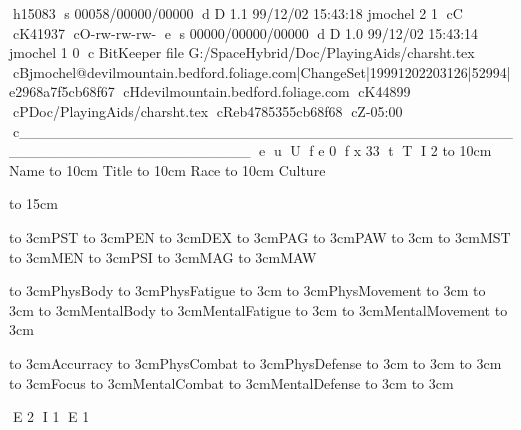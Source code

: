 h15083
s 00058/00000/00000
d D 1.1 99/12/02 15:43:18 jmochel 2 1
cC
cK41937
cO-rw-rw-rw-
e
s 00000/00000/00000
d D 1.0 99/12/02 15:43:14 jmochel 1 0
c BitKeeper file G:/SpaceHybrid/Doc/PlayingAids/charsht.tex
cBjmochel@devilmountain.bedford.foliage.com|ChangeSet|19991202203126|52994|e2968a7f5cb68f67
cHdevilmountain.bedford.foliage.com
cK44899
cPDoc/PlayingAids/charsht.tex
cReb4785355cb68f68
cZ-05:00
c______________________________________________________________________
e
u
U
f e 0
f x 33
t
T
I 2
\vbox{
	\hbox to 10cm {Name \hrulefill}
	\hbox to 10cm {Title \hrulefill}
	\hbox to 10cm {Race \hrulefill}
	\hbox to 10cm {Culture \hrulefill}
}
\bigskip

\hbox to 15cm{
	\vbox{
		\hbox to 3cm{PST \hrulefill}
		\hbox to 3cm{PEN \hrulefill}
		\hbox to 3cm{DEX \hrulefill}
		\hbox to 3cm{PAG \hrulefill}
		\hbox to 3cm{PAW \hrulefill}
		\hbox to 3cm{ \hrulefill}
		\hbox to 3cm{MST \hrulefill}
		\hbox to 3cm{MEN \hrulefill}
		\hbox to 3cm{PSI \hrulefill}
		\hbox to 3cm{MAG \hrulefill}
		\hbox to 3cm{MAW \hrulefill}
	}

	\hfil
	
	\vbox{
		\hbox to 3cm{PhysBody \hrulefill}
		\hbox to 3cm{PhysFatigue \hrulefill}
		\hbox to 3cm{}
		\hbox to 3cm{PhysMovement \hrulefill}
		\hbox to 3cm{}
		\hbox to 3cm{ \hrulefill}
		\hbox to 3cm{MentalBody \hrulefill}
		\hbox to 3cm{MentalFatigue \hrulefill}
		\hbox to 3cm{}
		\hbox to 3cm{MentalMovement \hrulefill}
		\hbox to 3cm{}
	}

	\hfil

	\vbox{
		\hbox to 3cm{Accurracy \hrulefill}
		\hbox to 3cm{PhysCombat \hrulefill}
		\hbox to 3cm{PhysDefense \hrulefill}
		\hbox to 3cm{}
		\hbox to 3cm{}
		\hbox to 3cm{ \hrulefill}
		\hbox to 3cm{Focus \hrulefill}
		\hbox to 3cm{MentalCombat \hrulefill}
		\hbox to 3cm{MentalDefense \hrulefill}
		\hbox to 3cm{}
		\hbox to 3cm{}
	}

}


E 2
I 1
E 1
